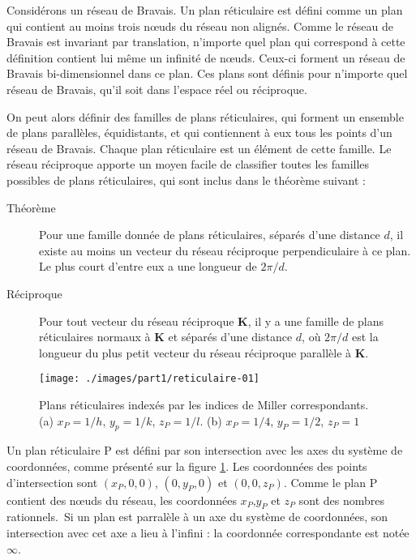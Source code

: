 Considérons un réseau de Bravais. Un plan réticulaire est défini comme un plan qui contient au moins trois nœuds du réseau non alignés. Comme le réseau de Bravais est invariant par translation, n'importe quel plan qui correspond à cette définition contient lui même un infinité de nœuds. Ceux-ci forment un réseau de Bravais bi-dimensionnel dans ce plan. Ces plans sont définis pour n'importe quel réseau de Bravais, qu'il soit dans l'espace réel ou réciproque.

On peut alors définir des familles de plans réticulaires, qui forment un ensemble de plans parallèles, équidistants, et qui contiennent à eux tous les points d'un réseau de Bravais. Chaque plan réticulaire est un élément de cette famille. Le réseau réciproque apporte un moyen facile de classifier toutes les familles possibles de plans réticulaires, qui sont inclus dans le théorème suivant :

\begin{description}
    \item[Théorème] Pour une famille donnée de plans réticulaires, séparés d'une distance $d$, il existe au moins un vecteur du réseau réciproque perpendiculaire à ce plan. Le plus court d'entre eux a une longueur de $2\pi/d$.
    \item[Réciproque] Pour tout vecteur du réseau réciproque $\mathbf{K}$, il y a une famille de plans réticulaires normaux à $\mathbf{K}$ et séparés d'une distance $d$, où $2\pi/d$ est la longueur du plus petit vecteur du réseau réciproque parallèle à $\mathbf{K}$.
\end{description}

\begin{figure}
    \texttt{[image: ./images/part1/reticulaire-01]}
    \caption{Plans réticulaires indexés par les indices de Miller correspondants. (a) $x_P = 1/h$, $y_p = 1/k$, $z_P = 1/l$. (b) $x_P = 1/4$, $y_P = 1/2$, $z_P = 1$}
    \label{fig:retic}
\end{figure}

Un plan réticulaire P est défini par son intersection avec les axes du système de coordonnées, comme présenté sur la figure \ref{fig:retic}. Les coordonnées des points d'intersection sont $(x_P,0,0)$, $(0,y_P,0)$ et $(0,0,z_P)$. Comme le plan P contient des nœuds du réseau, les coordonnées $x_P$,$y_P$ et $z_P$ sont des nombres rationnels. Si un plan est parralèle à un axe du système de coordonnées, son intersection avec cet axe a lieu à l'infini : la coordonnée correspondante est notée $\infty$.


